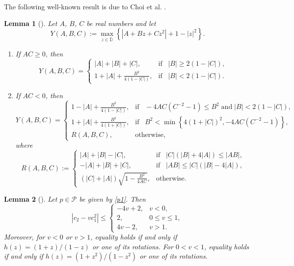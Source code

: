 \documentclass[10pt,a4paper]{amsart}
\newtheorem{lem}{Lemma}[section]
\newcommand{\ol}{\overline}
\numberwithin{equation}{section}
\begin{document}
The following well-known result is due to Choi et al. \cite{CKS1}.

\begin{lem}[\cite{CKS1}]\label{L2}
Let $A$, $B$, $C$ be real numbers and let
\[Y(A, B, C):= \max\limits_{z\in \ol{\mathbb{D}}}\left\lbrace |A+Bz+Cz^2|+1-|z|^2\right\rbrace.\]
\begin{enumerate} 
\item[(i)] If $AC\geq 0$, then
\[Y(A, B, C) =
\begin{cases}
|A|+|B|+|C|, & \text{if}\;\;\; |B|\geq 2(1-|C|), \\
1+|A|+\frac{B^2}{4(1-|C|)}, &\text{if}\;\;\; |B|<2(1-|C|).
\end{cases}
\]
\item[(ii)] If $AC<0$, then 
\[Y(A,B,C)=
\begin{cases}
1-|A|+\frac{B^2}{4(1-|C|)}, &\text{if}\;\;\; -4AC(C^{-2}-1) \leq B^2\; \text{and}\; |B|<2(1-|C|), \\
1+|A|+\frac{B^2}{4(1+|C|)}, &\text{if}\;\;\; B^2<\min\left\{4(1+|C|)^2, -4AC(C^{-2}-1) \right\}, \\
R(A,B,C), &\text{otherwise},
\end{cases}
\]
where
\[R(A,B,C):=
\begin{cases}
|A|+|B|-|C|, & \text{if}\;\;\; |C|(|B|+4|A|) \leq |AB|, \\
-|A|+|B|+|C|, & \text{if}\;\;\; |AB|\leq |C|(|B|-4|A|), \\
(|C|+|A| )\sqrt{1-\frac{B^2}{4AC}}, &\text{otherwise}.
\end{cases}
\]
\end{enumerate} 
\end{lem}

\begin{lem}[\cite{MM}]\label{L3}
Let $p \in \mathcal{P}$ be given by \eqref{p1}. Then
\[
\left| c_2 - v c_1^2 \right| \le 
\begin{cases}
-4v + 2, & v < 0, \\
2, & 0 \leq v \leq 1, \\
4v - 2, & v > 1.
\end{cases}
\]
Moreover, for $v < 0$ or $v > 1$, equality holds if and only if $h(z) = (1+z)/(1-z)$ or one of its rotations. For $0 < v < 1$, equality holds if and only if $h(z) = (1+z^2)/(1-z^2)$ or one of its rotations.
\end{lem}
\end{document}
